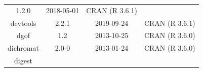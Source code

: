 \documentclass[11pt,]{book}
\begin{document}
\begin{longtable}[]{@{}cccc@{}}
\begin{minipage}[t]{0.19\columnwidth}
1.2.0\strut
\end{minipage} & \begin{minipage}[t]{0.16\columnwidth}\centering\strut
2018-05-01\strut
\end{minipage} & \begin{minipage}[t]{0.36\columnwidth}\centering\strut
CRAN (R 3.6.1)\strut
\end{minipage}\tabularnewline
\begin{minipage}[t]{0.18\columnwidth}\centering\strut
devtools\strut
\end{minipage} & \begin{minipage}[t]{0.19\columnwidth}\centering\strut
2.2.1\strut
\end{minipage} & \begin{minipage}[t]{0.16\columnwidth}\centering\strut
2019-09-24\strut
\end{minipage} & \begin{minipage}[t]{0.36\columnwidth}\centering\strut
CRAN (R 3.6.1)\strut
\end{minipage}\tabularnewline
\begin{minipage}[t]{0.18\columnwidth}\centering\strut
dgof\strut
\end{minipage} & \begin{minipage}[t]{0.19\columnwidth}\centering\strut
1.2\strut
\end{minipage} & \begin{minipage}[t]{0.16\columnwidth}\centering\strut
2013-10-25\strut
\end{minipage} & \begin{minipage}[t]{0.36\columnwidth}\centering\strut
CRAN (R 3.6.0)\strut
\end{minipage}\tabularnewline
\begin{minipage}[t]{0.18\columnwidth}\centering\strut
dichromat\strut
\end{minipage} & \begin{minipage}[t]{0.19\columnwidth}\centering\strut
2.0-0\strut
\end{minipage} & \begin{minipage}[t]{0.16\columnwidth}\centering\strut
2013-01-24\strut
\end{minipage} & \begin{minipage}[t]{0.36\columnwidth}\centering\strut
CRAN (R 3.6.0)\strut
\end{minipage}\tabularnewline
\begin{minipage}[t]{0.18\columnwidth}\centering\strut
digest\strut
\end{minipage} & \begin{minipage}[t]{0.19\columnwidth}\centering\strut

\end{minipage}
\end{longtable}
\end{document}
